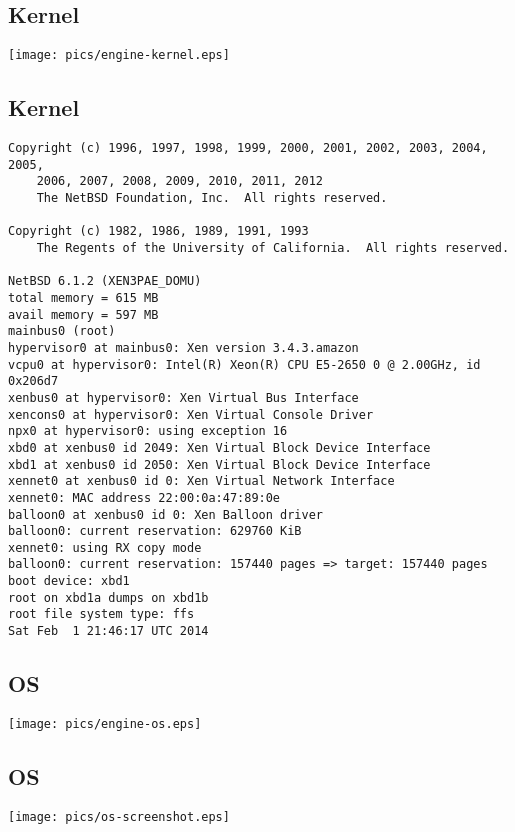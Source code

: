 \documentclass[xga]{xdvislides}
\begin{document}
\subsection{Kernel}
\begin{center}
        \texttt{[image: pics/engine-kernel.eps]}
\end{center}

\subsection{Kernel}
\small
\begin{verbatim}
Copyright (c) 1996, 1997, 1998, 1999, 2000, 2001, 2002, 2003, 2004, 2005,
    2006, 2007, 2008, 2009, 2010, 2011, 2012
    The NetBSD Foundation, Inc.  All rights reserved.

Copyright (c) 1982, 1986, 1989, 1991, 1993
    The Regents of the University of California.  All rights reserved.

NetBSD 6.1.2 (XEN3PAE_DOMU)
total memory = 615 MB
avail memory = 597 MB
mainbus0 (root)
hypervisor0 at mainbus0: Xen version 3.4.3.amazon
vcpu0 at hypervisor0: Intel(R) Xeon(R) CPU E5-2650 0 @ 2.00GHz, id 0x206d7
xenbus0 at hypervisor0: Xen Virtual Bus Interface
xencons0 at hypervisor0: Xen Virtual Console Driver
npx0 at hypervisor0: using exception 16
xbd0 at xenbus0 id 2049: Xen Virtual Block Device Interface
xbd1 at xenbus0 id 2050: Xen Virtual Block Device Interface
xennet0 at xenbus0 id 0: Xen Virtual Network Interface
xennet0: MAC address 22:00:0a:47:89:0e
balloon0 at xenbus0 id 0: Xen Balloon driver
balloon0: current reservation: 629760 KiB
xennet0: using RX copy mode
balloon0: current reservation: 157440 pages => target: 157440 pages
boot device: xbd1
root on xbd1a dumps on xbd1b
root file system type: ffs
Sat Feb  1 21:46:17 UTC 2014
\end{verbatim}
\Normalsize

\subsection{OS}
\begin{center}
	\texttt{[image: pics/engine-os.eps]}
\end{center}

\subsection{OS}
\begin{center}
	\texttt{[image: pics/os-screenshot.eps]}
\end{center}
\end{document}
